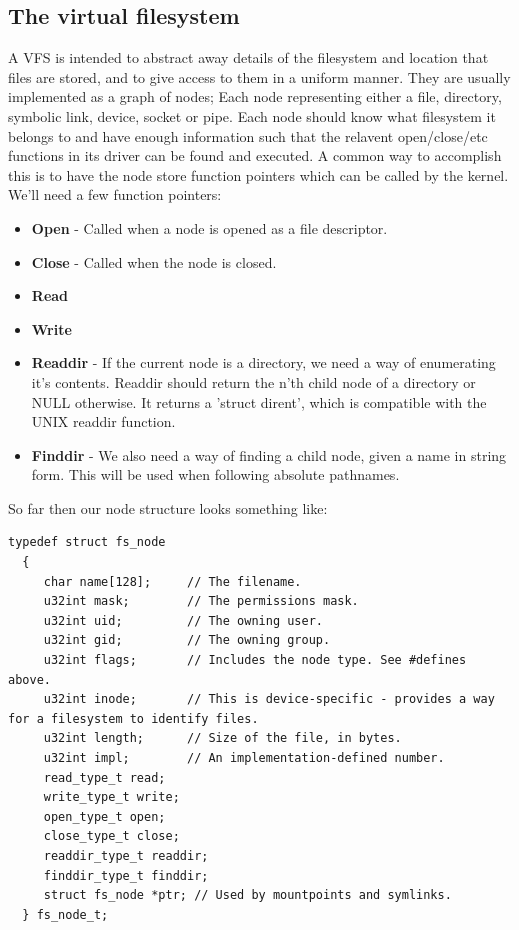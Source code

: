 \documentclass[12pt]{article}
\begin{document}
\subsection{The virtual filesystem}
A VFS is intended to abstract away details of the filesystem and location that files are stored, and to give access to them in a uniform manner. They are usually implemented as a graph of nodes; Each node representing either a file, directory, symbolic link, device, socket or pipe. Each node should know what filesystem it belongs to and have enough information such that the relavent open/close/etc functions in its driver can be found and executed. A common way to accomplish this is to have the node store function pointers which can be called by the kernel. We'll need a few function pointers:
\begin{itemize}
  \item \textbf{Open} - Called when a node is opened as a file descriptor.
  \item \textbf{Close} - Called when the node is closed.
  \item \textbf{Read}
  \item \textbf{Write}
  \item \textbf{Readdir} - If the current node is a directory, we need a way of enumerating it's contents. Readdir should return the n'th child node of a directory or NULL otherwise. It returns a 'struct dirent', which is compatible with the UNIX readdir function.
  \item \textbf{Finddir} - We also need a way of finding a child node, given a name in string form. This will be used when following absolute pathnames.
\end{itemize}
So far then our node structure looks something like:
\begin{lstlisting}[style=CStyle]
  typedef struct fs_node
  {
     char name[128];     // The filename.
     u32int mask;        // The permissions mask.
     u32int uid;         // The owning user.
     u32int gid;         // The owning group.
     u32int flags;       // Includes the node type. See #defines above.
     u32int inode;       // This is device-specific - provides a way for a filesystem to identify files.
     u32int length;      // Size of the file, in bytes.
     u32int impl;        // An implementation-defined number.
     read_type_t read;
     write_type_t write;
     open_type_t open;
     close_type_t close;
     readdir_type_t readdir;
     finddir_type_t finddir;
     struct fs_node *ptr; // Used by mountpoints and symlinks.
  } fs_node_t;
\end{lstlisting}
\end{document}
